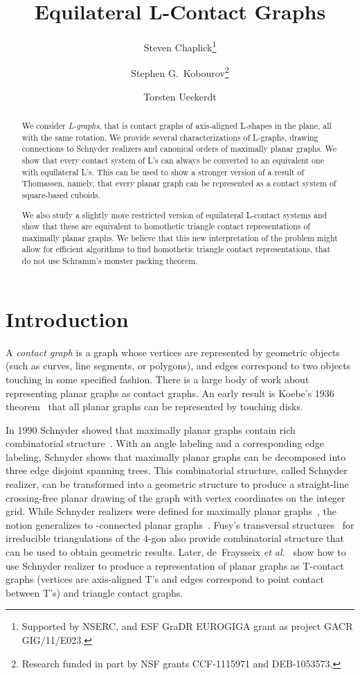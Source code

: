 \documentclass{llncs}
\title{Equilateral L-Contact Graphs}
\author{Steven Chaplick\inst{1}\thanks{Supported by NSERC, and ESF GraDR EUROGIGA grant as project GACR GIG/11/E023.}
\and 
Stephen G.~Kobourov\inst{2}\thanks{Research funded in part by NSF grants CCF-1115971 and DEB-1053573.}
\and 
Torsten Ueckerdt\inst{3}
}
\institute{Dept.~of Applied Mathematics, Charles University, Prague, Czech Republic
\and Dept.~of Computer Science, University of Arizona, Tucson AZ, USA \and Dept.~of Mathematics, Karlsruhe Istitute of Technology, Karlsruhe, Germany}
\begin{document}
\date{}


 \maketitle


\begin{abstract}
 We consider {\em L-graphs}, that is contact graphs of axis-aligned L-shapes in the plane, all with the same rotation. We provide several characterizations of L-graphs, drawing connections to Schnyder realizers and canonical orders of maximally planar graphs. We show that every contact system of L's can always be converted to an equivalent one with equilateral L's. This can be used to show a stronger version of a result of Thomassen, namely, that every planar graph can be represented as a contact system of square-based cuboids.
 
We also study a slightly more restricted version of equilateral L-contact systems and show that these are equivalent to homothetic triangle contact representations of maximally planar graphs. We believe that this new interpretation of the problem might allow for efficient algorithms to find homothetic triangle contact representations, that do not use Schramm's monster packing theorem.
\end{abstract}

\section{Introduction}\label{sec:introduction}
A \emph{contact graph} is a graph whose vertices are represented by geometric objects (such as curves, line segments, or polygons), and edges correspond to two objects touching in some specified fashion. There is a large body of work about representing planar graphs as contact graphs. An early result is Koebe's 1936 theorem~\cite{Koebe36} that all planar graphs can be represented by touching disks.

In 1990 Schnyder showed that maximally planar graphs contain rich combinatorial structure~\cite{s-epgg-90}. With an angle labeling and a corresponding edge labeling, Schnyder shows that maximally planar graphs can be decomposed into three edge disjoint spanning trees. This combinatorial structure, called Schnyder realizer, can be transformed into a geometric structure to produce a straight-line crossing-free planar drawing of the graph with vertex coordinates on the integer grid. While Schnyder realizers were defined for maximally planar graphs~\cite{s-epgg-90}, the notion generalizes to -connected planar graphs~\cite{f-lspg-04}. Fusy's transversal structures~\cite{Fusy09} for irreducible triangulations of the 4-gon also provide combinatorial structure that can be used to obtain geometric results. Later, de~Fraysseix {\em et al.}~\cite{FraysseixTContact} show how to use Schnyder realizer to produce a representation of planar graphs as T-contact graphs (vertices are axis-aligned T's and edges correspond to point contact between T's) and triangle contact graphs.
\end{document}
